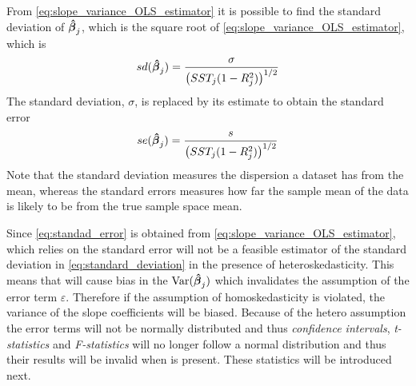From \eqref{eq:slope_variance_OLS_estimator} it is possible to find the standard deviation of $\operatorname{\boldsymbol{\hat{\beta}}}_j$, which is the square root of \ref{eq:slope_variance_OLS_estimator}, which is
\begin{align}\label{eq:standard_deviation}
    sd(\operatorname{\boldsymbol{\hat{\beta}}}_j) = \dfrac{\sigma}{\left(SST_j(1- R_j^2)\right)^{1/2}}
\end{align}
The standard deviation, $\sigma$, is replaced by its estimate to obtain the standard error
\begin{align}\label{eq:standad_error}
    se(\operatorname{\boldsymbol{\hat{\beta}}}_j) = \dfrac{s}{\big(SST_j(1- R_j^2)\big)^{1/2}}
\end{align}
Note that the standard deviation measures the dispersion a dataset has from the mean, whereas the standard errors measures how far the sample mean of the data is likely to be from the true sample space mean. 

Since \eqref{eq:standad_error} is obtained from \eqref{eq:slope_variance_OLS_estimator}, which relies on \homo the standard error will not be a feasible estimator of the standard deviation in \eqref{eq:standard_deviation} in the presence of heteroskedasticity. This means that \hetero will cause bias in the $\operatorname{\text{Var}}(\operatorname{\boldsymbol{\hat{\beta}}}_j)$ which invalidates the assumption of the error term $\varepsilon$.
Therefore if the assumption of homoskedasticity is violated, the variance of the slope coefficients will be biased. Because of the hetero assumption the error terms will not be normally distributed and thus \textit{confidence intervals}, \textit{t-statistics} and \textit{F-statistics} will no longer follow a normal distribution and thus their results will be invalid when \hetero is present. These statistics will be introduced next.










